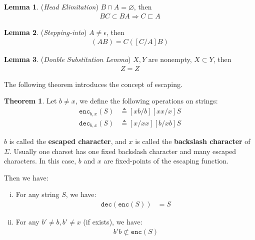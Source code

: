 \documentclass{article}
\theoremstyle{definition}
\newtheorem{theorem}{Theorem}[section]
\newtheorem{lemma}{Lemma}[section]
\begin{document}
\begin{lemma}
    (\emph{Head Elimitation})
    $B\cap A=\varnothing$, then
    \begin{align}
        BC\subset BA \Rightarrow C \sqsubset A
    \end{align}
\end{lemma}

\begin{lemma}
    (\emph{Stepping-into})
    $A\neq \epsilon$, then
    \begin{align}
        [C/A] (AB) = C([C/A]B)
    \end{align}
\end{lemma}

\begin{lemma}
    (\emph{Double Substitution Lemma})
    $X,Y$ are nonempty, $X\subset Y$, then
    \begin{align}
        [X/Y][Y/X]Z=Z
    \end{align}
    \label{lem:double substitution}
\end{lemma}

The following theorem introduces the concept of escaping.

\begin{theorem}
    Let $b\neq x$, we define the following operations on strings:
    \begin{align}
        \mathtt{enc}_{b,x}(S) & \triangleq [xb/b][xx/x]S \\
        \mathtt{dec}_{b,x}(S) & \triangleq [x/xx][b/xb]S
    \end{align}

    $b$ is called the \textbf{escaped character}, and $x$ is called the \textbf{backslash character} of $\Sigma$. Usually one charset has one fixed backslash character and many escaped characters. In this case, $b$ and $x$ are fixed-points of the escaping function.

    Then we have:
    \begin{enumerate}[(i)]
        \item For any string $S$, we have:
              \begin{align}
                  \mathtt{dec}(\mathtt{enc}(S)) & =S
              \end{align}
        \item For any $b'\neq b, b'\neq x$ (if exists), we have:
              \begin{align}
                  b'b \not\subset \mathtt{enc}(S)
              \end{align}
    \end{enumerate}
\end{theorem}
\end{document}
